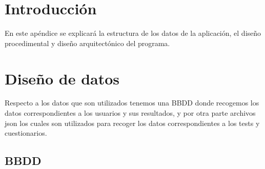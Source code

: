 
\section{Introducción}

En este apéndice se explicará la estructura de los datos de la aplicación, el diseño procedimental y diseño arquitectónico del programa.

\section{Diseño de datos}

Respecto a los datos que son utilizados tenemos una BBDD donde recogemos los datos correspondientes a los usuarios y sus resultados, y por otra parte archivos json los cuales son utilizados para recoger los datos correspondientes a los tests y cuestionarios.

\subsection{BBDD}

